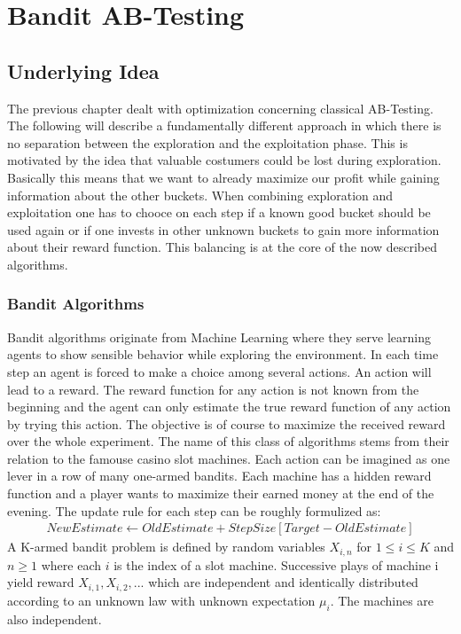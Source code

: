 \documentclass[main.tex]{subfiles}
\begin{document}
\chapter{Bandit AB-Testing}
\section{Underlying Idea}
The previous chapter dealt with optimization concerning classical AB-Testing. The following will describe a fundamentally different approach in which there is no separation between the exploration and the exploitation phase. This is motivated by the idea that valuable costumers could be lost during exploration. Basically this means that we want to already maximize our profit while gaining information about the other buckets. When combining exploration and exploitation one has to chooce on each step if a known good bucket should be used again or if one invests in other unknown buckets to gain more information about their reward function. This balancing is at the core of the now described algorithms.

\subsection{Bandit Algorithms}
Bandit algorithms originate from Machine Learning where they serve learning agents to show sensible behavior while exploring the environment. In each time step an agent is forced to make a choice among several actions. An action will lead to a reward. The reward function for any action is not known from the beginning and the agent can only estimate the true reward function of any action by trying this action. The objective is of course to maximize the received reward over the whole experiment. The name of this class of algorithms stems from their relation to the famouse casino slot machines. Each action can be imagined as one lever in a row of many one-armed bandits. Each machine has a hidden reward function and a player wants to maximize their earned money at the end of the evening. The update rule for each step can be roughly formulized as:
\begin{align*}
NewEstimate \leftarrow OldEstimate + StepSize[Target - OldEstimate]
\end{align*}
A K-armed bandit problem is defined by random variables $X_{i,n}$ for $1 \leq i \leq K$ and $n\geq1$ where each $i$ is the index of a slot machine. Successive plays of machine i yield reward $X_{i,1},X_{i,2},...$ which are independent and identically distributed according to an unknown law with unknown expectation $\mu_i$. The machines are also independent.
\end{document}

